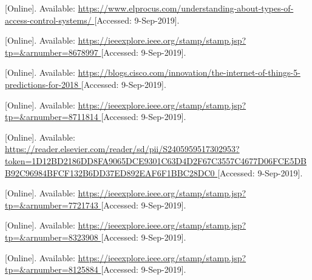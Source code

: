 \begin{thebibliography}{9}


[Online]. Available:
\url{
https://www.elprocus.com/understanding-about-types-of-access-control-systems/
}
[Accessed: 9-Sep-2019].




[Online]. Available:
\url{
https://ieeexplore.ieee.org/stamp/stamp.jsp?tp=&arnumber=8678997
}
[Accessed: 9-Sep-2019].



[Online]. Available:
\url{
https://blogs.cisco.com/innovation/the-internet-of-things-5-predictions-for-2018
}
[Accessed: 9-Sep-2019].



[Online]. Available:
\url{
https://ieeexplore.ieee.org/stamp/stamp.jsp?tp=&arnumber=8711814
}
[Accessed: 9-Sep-2019].



[Online]. Available:
\url{
https://reader.elsevier.com/reader/sd/pii/S2405959517302953?token=1D12BD2186DD8FA9065DCE9301C63D4D2F67C3557C4677D06FCE5DBB92C96984BFCF132B6DD37ED892EAF6F1BBC28DC0
}
[Accessed: 9-Sep-2019].


[Online]. Available:
\url{
https://ieeexplore.ieee.org/stamp/stamp.jsp?tp=&arnumber=7721743
}
[Accessed: 9-Sep-2019].


[Online]. Available:
\url{
https://ieeexplore.ieee.org/stamp/stamp.jsp?tp=&arnumber=8323908
}
[Accessed: 9-Sep-2019].



[Online]. Available:
\url{
https://ieeexplore.ieee.org/stamp/stamp.jsp?tp=&arnumber=8125884
}
[Accessed: 9-Sep-2019].



\end{thebibliography}
